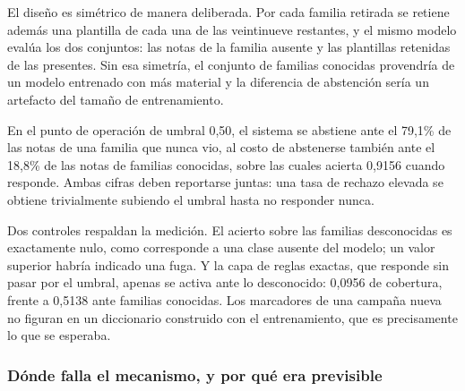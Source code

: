 El diseño es simétrico de manera deliberada. Por cada familia retirada se retiene además una plantilla de cada una de las veintinueve restantes, y el mismo modelo evalúa los dos conjuntos: las notas de la familia ausente y las plantillas retenidas de las presentes. Sin esa simetría, el conjunto de familias conocidas provendría de un modelo entrenado con más material y la diferencia de abstención sería un artefacto del tamaño de entrenamiento.

\begin{table}[ht]
\centering
\caption{La abstención como detector de familias desconocidas (30 familias, una fuera por turno)}
\label{tab:mundo_abierto}
\end{table}

En el punto de operación de umbral 0,50, el sistema se abstiene ante el 79,1\% de las notas de una familia que nunca vio, al costo de abstenerse también ante el 18,8\% de las notas de familias conocidas, sobre las cuales acierta 0,9156 cuando responde. Ambas cifras deben reportarse juntas: una tasa de rechazo elevada se obtiene trivialmente subiendo el umbral hasta no responder nunca.

Dos controles respaldan la medición. El acierto sobre las familias desconocidas es exactamente nulo, como corresponde a una clase ausente del modelo; un valor superior habría indicado una fuga. Y la capa de reglas exactas, que responde sin pasar por el umbral, apenas se activa ante lo desconocido: 0,0956 de cobertura, frente a 0,5138 ante familias conocidas. Los marcadores de una campaña nueva no figuran en un diccionario construido con el entrenamiento, que es precisamente lo que se esperaba.

\subsubsection*{Dónde falla el mecanismo, y por qué era previsible}


